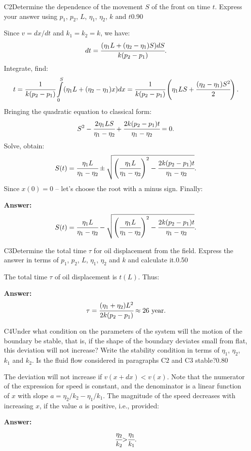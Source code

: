 \documentclass[11pt,a4paper]{article}
\begin{document}
\begin{solcard}{C2}{Determine the dependence of the movement $S$ of the front on time $t$. Express your answer using $p_1$, $p_2$, $L$, $\eta_1$, $\eta_2$, $k$ and $t$}{0.90}

Since $v=dx/dt$ and $k_1=k_2=k$, we have: $$dt=\cfrac{(\eta_1L+(\eta_2-\eta_1)S)dS}{k(p_2-p_1)}{.} $$Integrate, find: $$t=\cfrac{1}{k(p_2-p_1)}\int\limits_{0}^S(\eta_1L+(\eta_2-\eta_1)x)dx=\cfrac{1}{k(p_2-p_1)}\left(\eta_1LS+\cfrac{(\eta_2-\eta_1)S^2}{2}\right){.} $$Bringing the quadratic equation to classical form: $$S^2-\cfrac{2\eta_1LS}{\eta_1-\eta_2}+\cfrac{2k(p_2-p_1)t}{\eta_1-\eta_2}=0{.} $$Solve, obtain: $$S(t)=\cfrac{\eta_1L}{\eta_1-\eta_2}\pm\sqrt{\left(\cfrac{\eta_1L}{\eta_1-\eta_2}\right)^2-\cfrac{2k(p_2-p_1)t}{\eta_1-\eta_2}}{.} $$Since $x(0)=0$ – let’s choose the root with a minus sign. Finally:

\par\smallskip\noindent\textbf{Answer:} $$S(t)=\cfrac{\eta_1L}{\eta_1-\eta_2}-\sqrt{\left(\cfrac{\eta_1L}{\eta_1-\eta_2}\right)^2-\cfrac{2k(p_2-p_1)t}{\eta_1-\eta_2}}{.} $$
\end{solcard}

\begin{solcard}{C3}{Determine the total time $\tau$ for oil displacement from the field. Express the answer in terms of $p_1$, $p_2$, $L$, $\eta_1$, $\eta_2$ and $k$ and calculate it.}{0.50}

The total time $\tau$ of oil displacement is $t(L)$. Thus:

\par\smallskip\noindent\textbf{Answer:} $$\tau=\cfrac{(\eta_1+\eta_2)L^2}{2k(p_2-p_1)}\approx 26~\text{year}{.} $$
\end{solcard}

\begin{solcard}{C4}{Under what condition on the parameters of the system will the motion of the boundary be stable, that is, if the shape of the boundary deviates small from flat, this deviation will not increase? Write the stability condition in terms of $\eta_1$, $\eta_2$, $k_1$ and $k_2$. Is the fluid flow considered in paragraphs $\mathrm{C2}$ and $\mathrm{C3}$ stable?}{0.80}

The deviation will not increase if $v(x+dx){<}v(x)$. Note that the numerator of the expression for speed is constant, and the denominator is a linear function of $x$ with slope $a=\eta_2/k_2-\eta_1/k_1$. The magnitude of the speed decreases with increasing $x$, if the value $a$ is positive, i.e., provided:

\par\smallskip\noindent\textbf{Answer:} $$\cfrac{\eta_2}{k_2}{>}\cfrac{\eta_1}{k_1}{.} $$
\end{solcard}
\end{document}

